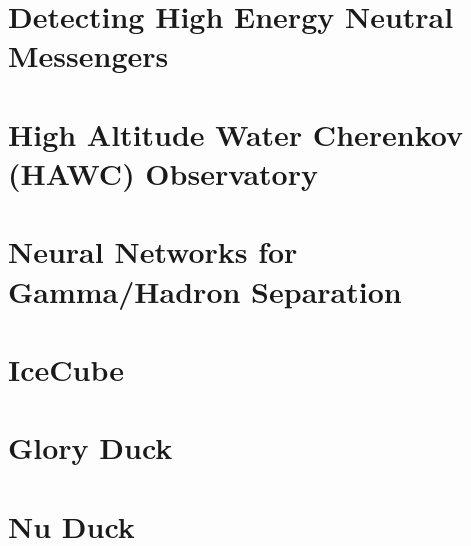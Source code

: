 \documentclass[PhD]{msu-thesis}
\begin{document}
\chapter{Detecting High Energy Neutral Messengers\label{sec:multmessenger}}


\chapter{High Altitude Water Cherenkov (HAWC) Observatory\label{sec:hawc}}


\chapter{Neural Networks for Gamma/Hadron Separation}


\chapter{IceCube\label{sec:ice3}}

\chapter{Glory Duck\label{sec:glory_duck}}

\chapter{Nu Duck\label{sec:nu_duck}}

\end{document}
